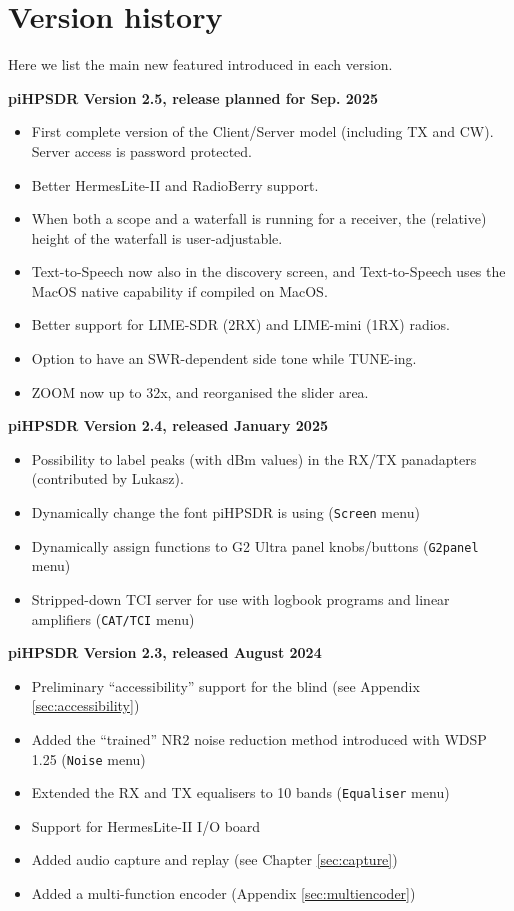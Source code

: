 \documentclass[12pt]{book}
\def\bltt#1{\texttt{\color{blue}#1}}
\def\pH{pi\-HPSDR\xspace}
\begin{document}
\clearpage
\section{Version history}
\label{sec:versionhistory}
Here we list the main new featured introduced in each version.

\medskip
\textbf{\pH Version 2.5, release planned for Sep. 2025}
\begin{itemize}
\item{First complete version of the Client/Server model (including TX and CW).
Server access is password protected.}
\item{Better HermesLite-II and RadioBerry support.}
\item{When both a scope and a waterfall is running for a receiver, the (relative) height of
the waterfall is user-adjustable.}
\item{Text-to-Speech now also in the discovery screen, and Text-to-Speech uses the MacOS native
capability if compiled on MacOS.}
\item{Better support for LIME-SDR (2RX) and LIME-mini (1RX) radios.}
\item{Option to have an SWR-dependent side tone while TUNE-ing.}
\item{ZOOM now up to 32x, and reorganised the slider area.}
\end{itemize}

\medskip
\textbf{\pH Version 2.4, released January 2025}
\begin{itemize}
\item{Possibility to label peaks (with dBm values) in the RX/TX panadapters (contributed
by Lukasz).}
\item{Dynamically change the font \pH is using (\bltt{Screen} menu)}
\item{Dynamically assign functions to G2 Ultra panel knobs/buttons (\bltt{G2panel} menu)}
\item{Stripped-down TCI server for use with logbook programs and linear amplifiers (\bltt{CAT/TCI} menu)}
\end{itemize}

\medskip
\textbf{\pH Version 2.3, released August 2024}
\begin{itemize}
\item{Preliminary ``accessibility'' support for the blind (see Appendix \ref{sec:accessibility})}
\item{Added the ``trained'' NR2 noise reduction method introduced with WDSP 1.25 (\bltt{Noise} menu)}
\item{Extended the RX and TX equalisers to 10 bands (\bltt{Equaliser} menu)}
\item{Support for HermesLite-II I/O board}
\item{Added audio capture and replay (see Chapter \ref{sec:capture})}
\item{Added a multi-function encoder (Appendix \ref{sec:multiencoder})}
\end{itemize}
\end{document}
